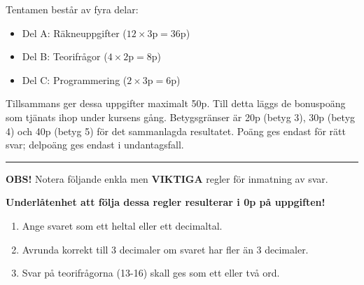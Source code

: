 Tentamen består av fyra delar:
\begin{itemize}
\item
  Del A: Räkneuppgifter ($12 \times 3\mathrm{p} = 36\mathrm{p}$)
\item
  Del B: Teorifrågor ($4 \times 2\mathrm{p} = 8\mathrm{p}$)
\item
  Del C: Programmering ($2 \times 3\mathrm{p} = 6\mathrm{p}$)
\end{itemize}
Tillsammans ger dessa uppgifter maximalt 50p.
Till detta läggs de bonuspoäng som tjänats ihop under kursens gång.
Betygsgränser är 20p (betyg 3), 30p (betyg 4) och 40p (betyg 5)
för det sammanlagda resultatet. Poäng ges endast för rätt svar;
delpoäng ges endast i undantagsfall.

\bigskip

\hrule

\smallskip

\textbf{OBS!} Notera följande enkla men \textbf{VIKTIGA} regler för inmatning av svar.

\textbf{Underlåtenhet att följa dessa regler resulterar i 0p på uppgiften!}

\begin{enumerate}
\item
  Ange svaret som ett heltal eller ett decimaltal.
\item
  Avrunda korrekt till 3 decimaler om svaret har fler än 3 decimaler.
\item
  Svar på teorifrågorna (13-16) skall ges som ett eller två ord.
\end{enumerate}
